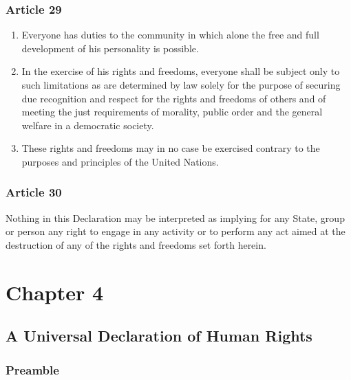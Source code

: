 \documentclass[
  titlepage,
  openright,
  DIV=calc,
  toc=listof,
  listof=nochaptergap]{scrbook}
\begin{document}
\hypertarget{article-29-2}{%
\subsection{Article 29}\label{article-29-2}}

\begin{enumerate}
\def\labelenumi{\arabic{enumi}.}
\item
  Everyone has duties to the community in which alone the free and full
  development of his personality is possible.
\item
  In the exercise of his rights and freedoms, everyone shall be subject
  only to such limitations as are determined by law solely for the
  purpose of securing due recognition and respect for the rights and
  freedoms of others and of meeting the just requirements of morality,
  public order and the general welfare in a democratic society.
\item
  These rights and freedoms may in no case be exercised contrary to the
  purposes and principles of the United Nations.
\end{enumerate}

\hypertarget{article-30-2}{%
\subsection{Article 30}\label{article-30-2}}

Nothing in this Declaration may be interpreted as implying for any
State, group or person any right to engage in any activity or to perform
any act aimed at the destruction of any of the rights and freedoms set
forth herein.

\hypertarget{sec:chapter4}{%
\chapter{Chapter 4}\label{sec:chapter4}}

\hypertarget{a-universal-declaration-of-human-rights-3}{%
\section{A Universal Declaration of Human
Rights}\label{a-universal-declaration-of-human-rights-3}}

\hypertarget{preamble-3}{%
\subsection{Preamble}\label{preamble-3}}
\end{document}
